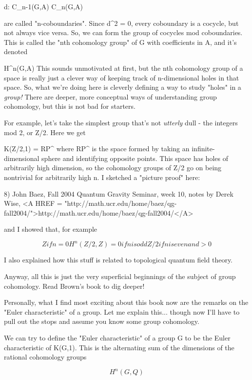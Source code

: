 d: C_{n-1}(G,A) \to  C_{n}(G,A)

are called "n-coboundaries".   Since d^{2} 
= 0, every coboundary is
a cocycle, but not always vice versa.  So, we can form the group of
cocycles mod coboundaries.  This is called the "nth cohomology
group" of G with coefficients in A, and it's denoted

H^{n}(G,A)
This sounds unmotivated at first, but the nth cohomology group of a
space is really just a clever way of keeping track of n-dimensional 
holes in that space.  So, what we're doing here is cleverly defining
a way to study "holes" in a \emph{group!}  
There are deeper, more conceptual
ways of understanding group cohomology, but this is not bad for starters.

For example, let's take the simplest group that's not \emph{utterly} dull -
the integers mod 2, or Z/2.  Here we get 

K(Z/2,1) = RP^{\infty }
where RP^{\infty } 
is the space formed by taking an infinite-dimensional
sphere and identifying opposite points.  This space has holes of 
arbitrarily high dimension, so the cohomology groups of Z/2 go on being 
nontrivial for arbitrarily high n.  I sketched a "picture proof" here:

8) John Baez, Fall 2004 Quantum Gravity Seminar, week 10, notes
by Derek Wise, <A HREF = "http://math.ucr.edu/home/baez/qg-fall2004/">http://math.ucr.edu/home/baez/qg-fall2004/</A>

and I showed that, for example


$$

            Z   if n = 0
H^{n}(Z/2,Z) = 0   if n is odd
            Z/2 if n is even and > 0
$$
    
I also explained how this stuff is related to topological quantum field
theory.

Anyway, all this is just the very superficial beginnings of the subject
of group cohomology.  Read Brown's book to dig deeper!

Personally, what I find most exciting about this book now are the
remarks on the "Euler characteristic" of a group.  Let me 
explain this...
though now I'll have to pull out the stops and assume you know some
group cohomology.

We can try to define the "Euler characteristic" of a group G to be the 
Euler characteristic of K(G,1).  This is the alternating sum of the 
dimensions of the rational cohomology groups


$$

H^{n}(G,Q)
$$
    

